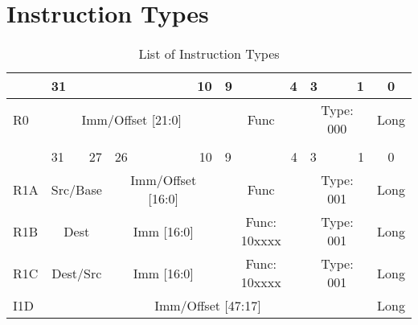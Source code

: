 \documentclass{article}
\begin{document}
    \newpage
    

\section{Instruction Types}

    \begin{table}[H]
    \centering
    \caption{List of Instruction Types}
    \label{table:inst_type_old}
    \begin{tabular}{|l|l|r|l|r|l|r|l|r|l|r|l|r|l|r|c|}

    \hline      &   \multicolumn{9}{l}{31}  &   10              &   \multicolumn{1}{l}{9}   &   4   &   \multicolumn{1}{l}{3}   &   1   &   0 \\
    \hline R0   &   \multicolumn{10}{|c|}{Imm/Offset [21:0]}    &   \multicolumn{2}{|c|}{Func}      &   \multicolumn{2}{|c|}{Type: 000} &   Long \\
    
    \hline          \multicolumn{16}{c}{} \\

    
    \hline      &   \multicolumn{1}{l}{31}  &   27      &   \multicolumn{7}{l}{26}  &   10          &   \multicolumn{1}{l}{9}   &   4   &   \multicolumn{1}{l}{3}   &   1   &   0 \\
    \hline R1A  &   \multicolumn{2}{|c|}{Src/Base}      &   \multicolumn{8}{|c|}{Imm/Offset [16:0]} &   \multicolumn{2}{|c|}{Func}      &   \multicolumn{2}{|c|}{Type: 001} &   Long \\
    
    \hline R1B  &   \multicolumn{2}{|c|}{Dest}          &   \multicolumn{8}{|c|}{Imm [16:0]}    &   \multicolumn{2}{|c|}{Func: 10xxxx}  &   \multicolumn{2}{|c|}{Type: 001} &   Long \\

    \hline R1C  &   \multicolumn{2}{|c|}{Dest/Src}      &   \multicolumn{8}{|c|}{Imm [16:0]}    &   \multicolumn{2}{|c|}{Func: 10xxxx}  &   \multicolumn{2}{|c|}{Type: 001} &   Long \\

    \hline I1D  &   \multicolumn{14}{|c|}{Imm/Offset [47:17]}   &   Long \\
    

\end{tabular}
\end{table}
\end{document}
